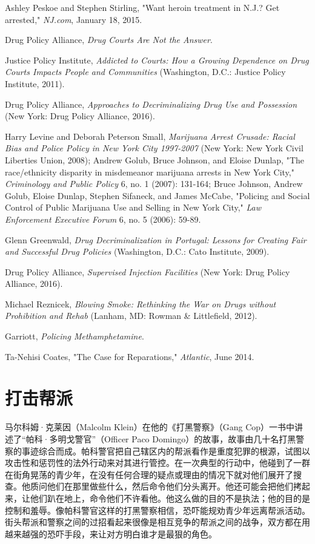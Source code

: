 \documentclass[fontset=fandol, a4paper, 12pt, openright]{ctexbook}
\begin{document}
\begin{enumerate}[label={[\arabic*]}]
    \item Ashley Peskoe and Stephen Stirling, "Want heroin treatment in N.J.? Get arrested," \textit{NJ.com}, January 18, 2015.
    \item Drug Policy Alliance, \textit{Drug Courts Are Not the Answer}.
    \item Justice Policy Institute, \textit{Addicted to Courts: How a Growing Dependence on Drug Courts Impacts People and Communities} (Washington, D.C.: Justice Policy Institute, 2011).
    \item Drug Policy Alliance, \textit{Approaches to Decriminalizing Drug Use and Possession} (New York: Drug Policy Alliance, 2016).
    \item Harry Levine and Deborah Peterson Small, \textit{Marijuana Arrest Crusade: Racial Bias and Police Policy in New York City 1997-2007} (New York: New York Civil Liberties Union, 2008); Andrew Golub, Bruce Johnson, and Eloise Dunlap, "The race/ethnicity disparity in misdemeanor marijuana arrests in New York City," \textit{Criminology and Public Policy} 6, no. 1 (2007): 131-164; Bruce Johnson, Andrew Golub, Eloise Dunlap, Stephen Sifaneck, and James McCabe, "Policing and Social Control of Public Marijuana Use and Selling in New York City," \textit{Law Enforcement Executive Forum} 6, no. 5 (2006): 59-89.
    \item Glenn Greenwald, \textit{Drug Decriminalization in Portugal: Lessons for Creating Fair and Successful Drug Policies} (Washington, D.C.: Cato Institute, 2009).
    \item Drug Policy Alliance, \textit{Supervised Injection Facilities} (New York: Drug Policy Alliance, 2016).
    \item Michael Reznicek, \textit{Blowing Smoke: Rethinking the War on Drugs without Prohibition and Rehab} (Lanham, MD: Rowman \& Littlefield, 2012).
    \item Garriott, \textit{Policing Methamphetamine}.
    \item Ta-Nehisi Coates, "The Case for Reparations," \textit{Atlantic}, June 2014.
\end{enumerate}

\chapter{打击帮派}

马尔科姆·克莱因（Malcolm Klein）在他的《打黑警察》（Gang Cop）一书中讲述了“帕科·多明戈警官”（Officer Paco Domingo）的故事，故事由几十名打黑警察的事迹综合而成。帕科警官把自己辖区内的帮派看作是重度犯罪的根源，试图以攻击性和惩罚性的法外行动来对其进行管控。在一次典型的行动中，他碰到了一群在街角晃荡的青少年，在没有任何合理的疑点或理由的情况下就对他们展开了搜查。他质问他们在那里做些什么，然后命令他们分头离开。他还可能会把他们拷起来，让他们趴在地上，命令他们不许看他。他这么做的目的不是执法；他的目的是控制和羞辱。像帕科警官这样的打黑警察相信，恐吓能规劝青少年远离帮派活动。街头帮派和警察之间的过招看起来很像是相互竞争的帮派之间的战争，双方都在用越来越强的恐吓手段，来让对方明白谁才是最狠的角色。
\end{document}
